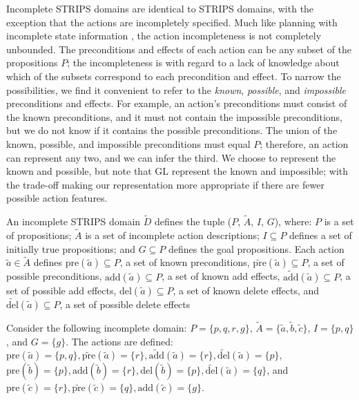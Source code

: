 \documentclass{article}
\def\citep#1{\cite{#1}} \def\citet#1{\citeA{#1}}
\def\und#1{\noindent{\bf #1}:}
\newtheorem{definition}[theorem]{Definition}
\def\und#1{\medskip{\noindent\bf #1:}}
\begin{document}
\und{Incomplete STRIPS Domains}
Incomplete STRIPS domains are identical to STRIPS domains, with the exception
that the actions are incompletely specified.  Much like planning with incomplete
state information \citep{pff,aij-mclug}, the action incompleteness is not
completely unbounded.  The preconditions and effects of each action can be any
subset of the propositions $P$; the incompleteness is with regard to a lack of
knowledge about which of the subsets correspond to each precondition and effect.
 To narrow the possibilities, we find it convenient to refer to the {\em known},
{\em possible}, and {\em impossible} preconditions and effects.  For example, an
action's preconditions must consist of the known preconditions, and it must not
contain the impossible preconditions, but we do not know if it contains the
possible preconditions.  The union of the known, possible, and impossible
preconditions must equal $P$; therefore, an action can represent any two, and we
can infer the third.  We choose to represent the known and possible, but note
that GL represent the known and impossible; with the trade-off making our
representation more appropriate if there are fewer possible action features.




An incomplete STRIPS domain $\tilde{D}$  defines the tuple ($P$, $\tilde{A}$,
$I$, $G$), where: $P$ is a  set of propositions; $\tilde{A}$ is a set of
incomplete action descriptions; $I \subseteq P$ defines a set of initially true
propositions; and $G \subseteq P$ defines the goal propositions. Each action
$\tilde{a} \in \tilde{A}$ defines $\text{pre}(\tilde{a}) \subseteq P$, a set of
known preconditions, $\widetilde{\text{pre}}(\tilde{a}) \subseteq P$, a set of
possible preconditions, $\text{add}(\tilde{a}) \subseteq P$, a set of known add
effects,  $\widetilde{\text{add}}(\tilde{a}) \subseteq P$, a set of possible add
effects, $\text{del}(\tilde{a}) \subseteq P$, a set of known delete effects, and
$\widetilde{\text{del}}(\tilde{a}) \subseteq P$, a set of possible delete
effects

Consider the following incomplete domain: $P = \{p, q, r, g\}$, $\tilde{A} = \{\tilde{a}, \tilde{b}, \tilde{c}\}$, $I = \{p, q\}$, and $G= \{g\}$.  The actions are defined: 
$\text{pre}(\tilde{a}) = \{p, q\}, \widetilde{\text{pre}}(\tilde{a})  = \{r\}, \widetilde{\text{add}}(\tilde{a}) = \{r\},  \widetilde{\text{del}}(\tilde{a}) = \{p\}$, $
  \text{pre}(\tilde{b}) = \{p\}, 
 \text{add}(\tilde{b}) = \{r\}, 
  \text{del}(\tilde{b}) = \{p\}, \widetilde{\text{del}}(\tilde{a}) = \{q\}$, and 
 $ \text{pre}(\tilde{c}) = \{r\}, \widetilde{\text{pre}}(\tilde{c})  = \{q\}, 
\text{add}(\tilde{c}) = \{g\}$.
\end{document}

